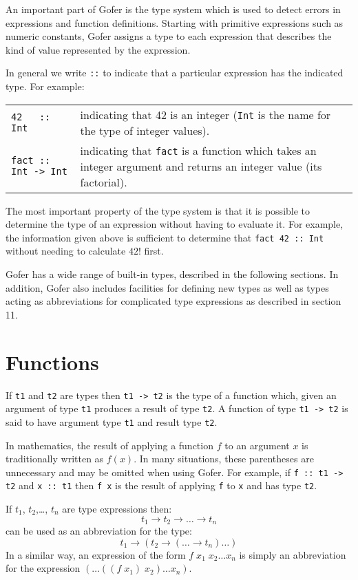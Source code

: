 An important part of Gofer is the type system which is used  to  detect
errors  in  expressions  and  function  definitions.    Starting   with
primitive expressions such as numeric constants, Gofer assigns  a  type
to each expression that describes the kind of value represented by  the
expression.

In  general  we write   \verb"::" 
to indicate  that  a  particular
expression has the indicated type.  For example:
\BQ
\begin{tabular}{lp{8cm}}
    \verb"42   :: Int" &   indicating that  42  is an  integer 
                           (\verb"Int" is the
                            name for the type of integer values).\\
    \verb"fact :: Int -> Int" &  indicating  that  \verb"fact"  
                         is a  function  which
                        takes  an  integer  argument  and  returns   an
                        integer value (its factorial).
\end{tabular}
\EQ
The most important property of the type system is that it  is  possible
to determine the type of an expression without having to  evaluate  it.
For example, the information given above  is  sufficient  to  determine
that \verb"fact 42 :: Int" without needing to calculate $42!$ first.

Gofer has a wide range of built-in types, described  in  the  following
sections.  In addition, Gofer also includes facilities for defining new
types as well as types acting as  abbreviations  for  complicated  type
expressions as described in section 11.


\section{Functions}
If \verb"t1" and \verb"t2" are types then \verb"t1 -> t2" 
is the type of a  function  which,
given an argument of type \verb"t1" produces a result of type \verb"t2".
A  function
of type \verb"t1 -> t2" is said to have argument type \verb"t1"
and result type \verb"t2".

In mathematics, the result of applying a function $f$ to an argument $x$ is
traditionally written as $f(x)$.  In many situations,  these  parentheses
are unnecessary and may be omitted when using Gofer.
For example, if \verb"f :: t1 -> t2" and \verb"x :: t1"
then \verb"f x" is the result of applying
\verb"f" to \verb"x" and has type \verb"t2".


If $t_1$, $t_2$,\dots , $t_n$ are type expressions then:
\[
  t_1 \to t_2 \to \dots \to t_n
\]
can be used as an abbreviation for the type:
\[
  t_1 \to (t_2 \to ( \dots \to t_n) \dots ) 
\]
In a similar way, an expression of the form 
$f\; x_1\; x_2 \dots x_n$ is simply an
abbreviation for the expression 
$(\dots ((f\; x_1)\; x_2) \dots x_n)$.

